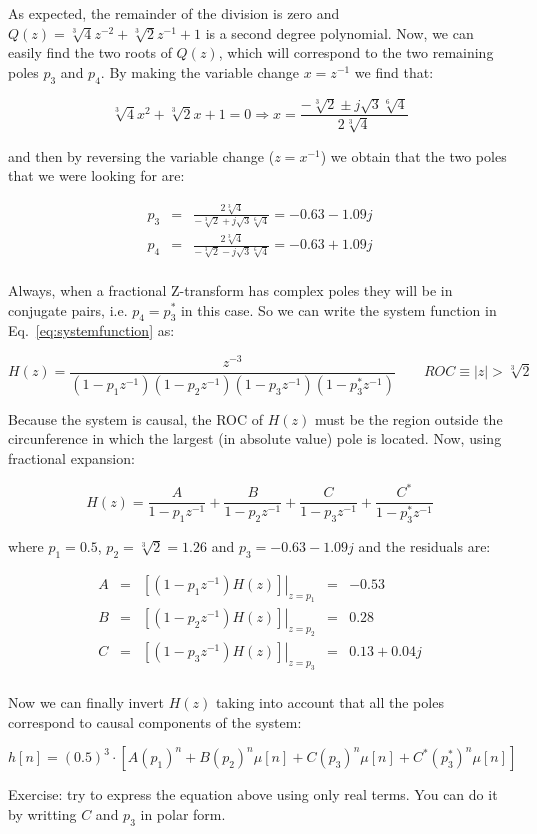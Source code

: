 \documentclass[a4paper,11pt,oneside]{article}
\begin{document}
As expected, the remainder of the division is zero and $Q(z)=\sqrt[3]{4}z^{-2}+\sqrt[3]{2}z^{-1}+1$ is a second degree polynomial. Now, we can easily find the two roots of $Q(z)$, which will correspond to the two remaining poles $p_3$ and $p_4$. By making the variable change $x=z^{-1}$ we find that:

\[
\sqrt[3]{4}x^{2}+\sqrt[3]{2}x+1=0 \Rightarrow x = \frac{-\sqrt[3]{2}\pm j\sqrt{3}\sqrt[6]{4}}{2\sqrt[3]{4}}
\]

and then by reversing the variable change ($z=x^{-1}$) we obtain that the two poles that we were looking for are:

\[
\begin{array}{lllll}
p_3&=& \frac{2\sqrt[3]{4}}{-\sqrt[3]{2}+ j\sqrt{3}\sqrt[6]{4}}=-0.63-1.09j\\
p_4&=& \frac{2\sqrt[3]{4}}{-\sqrt[3]{2}- j\sqrt{3}\sqrt[6]{4}}=-0.63+1.09j\\
\end{array}
\]

Always, when a fractional Z-transform has complex poles they will be in conjugate pairs, i.e. $p_4=p_3^*$ in this case. So we can write the system function in Eq.~\ref{eq:systemfunction} as:

\[
H(z)=\frac{z^{-3}}{(1-p_1z^{-1})(1-p_2z^{-1})(1-p_3z^{-1})(1-p_3^*z^{-1})} \qquad ROC \equiv |z|>\sqrt[3]{2}
\]

Because the system is causal, the ROC of $H(z)$ must be the region outside the circunference in which the largest (in absolute value) pole is located. Now, using fractional expansion:

\[
H(z) =  \frac{A}{1-p_1z^{-1}}+\frac{B}{1-p_2z^{-1}}+\frac{C}{1-p_3z^{-1}}+\frac{C^*}{1-p_3^*z^{-1}}
\]

where $p_1=0.5$, $p_2=\sqrt[3]{2}=1.26$ and $p_3=-0.63-1.09j$ and the residuals are:

\begin{equation}
\begin{array}{lllll}
A &=& \left.\left[(1-p_1z^{-1})H(z)\right]\right|_{z=p_1}&=&-0.53\\
B &=& \left.\left[(1-p_2z^{-1})H(z)\right]\right|_{z=p_2}&=&0.28\\
C &=& \left.\left[(1-p_3z^{-1})H(z)\right]\right|_{z=p_3}&=&0.13+0.04j\\
\end{array}
\end{equation}

Now we can finally invert $H(z)$ taking into account that all the poles correspond to causal components of the system:

\begin{equation}\label{impulse}
h[n] = (0.5)^3\cdot\left[A(p_1)^n+B(p_2)^n\mu[n]+C(p_3)^n\mu[n]+C^*(p_3^*)^n\mu[n]\right]
\end{equation}


Exercise: try to express the equation above using only real terms. You can do it by writting $C$ and $p_3$ in polar form.
\end{document}
